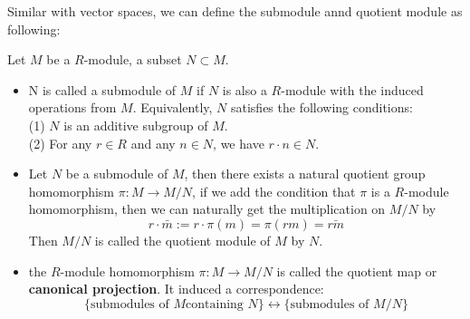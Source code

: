 Similar with vector spaces, we can define the submodule annd quotient module as following:
\begin{definition}
    Let \(M\) be a \(R\)-module, a subset \(N \subset M\).
    \begin{itemize}
        \item N is called a submodule of \(M\) if \(N\) is also a \(R\)-module with the induced operations from \(M\). Equivalently, \(N\) satisfies the following conditions:\\
        (1) \(N\) is an additive subgroup of \(M\).\\
        (2) For any \(r \in R\) and any \(n \in N\), we have \(r \cdot n \in N\).

        \item Let \(N\) be a submodule of \(M\), then there exists a natural quotient group homomorphism \(\pi: M \to M/N\), if we add the condition that \(\pi\) is a \(R\)-module homomorphism, then we can naturally get the multiplication on \(M/N\) by
        \[r \cdot \bar{m} := r \cdot \pi(m) = \pi(rm) = \bar{rm}\]
        Then \(M/N\) is called the quotient module of \(M\) by \(N\).

        \item the \(R\)-module homomorphism \(\pi: M \to M/N\) is called the quotient map or \textbf{canonical projection}. It induced a correspondence:
        \[\{\text{submodules of } M  \text{containing } N\} \leftrightarrow \{\text{submodules  of } M/N\}\]
    \end{itemize}

\end{definition}

